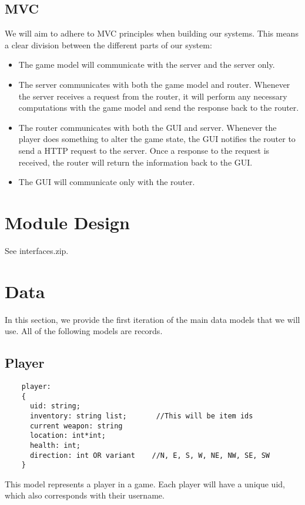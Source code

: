 \documentclass{article}
\begin{document}
	\subsection{MVC}
	We will aim to adhere to MVC principles when building our systems. This means a clear division between the different parts of our system:
	\begin{itemize}
		\item The game model will communicate with the server and the server only. 
		\item The server communicates with both the game model and router. Whenever the server receives a request from the router, it will perform any necessary computations with the game model and send the response back to the router.
		\item The router communicates with both the GUI and server. Whenever the player does something to alter the game state, the GUI notifies the router to send a HTTP request to the server. Once a response to the request is received, the router will return the information back to the GUI.
		\item The GUI will communicate only with the router. 
	\end{itemize}
	
    \section{Module Design}

        See interfaces.zip.

    \section{Data}
    	In this section, we provide the first iteration of the main data models that we will use. All of the following models are records. 
	
	\subsection{Player}
	\begin{verbatim}
	player:
	{
	  uid: string;
	  inventory: string list;    	//This will be item ids
	  current weapon: string
	  location: int*int;
	  health: int;
	  direction: int OR variant    //N, E, S, W, NE, NW, SE, SW
	}	
	\end{verbatim}
	This model represents a player in a game. Each player will have a unique uid, which also corresponds with their username.
	
\end{document}
